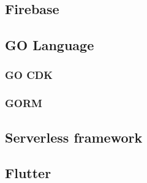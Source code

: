 \subsection{Firebase}
\subsection{GO Language}
\subsubsection{GO CDK}
\subsubsection{GORM}
\subsection{Serverless framework}
\subsection{Flutter}
